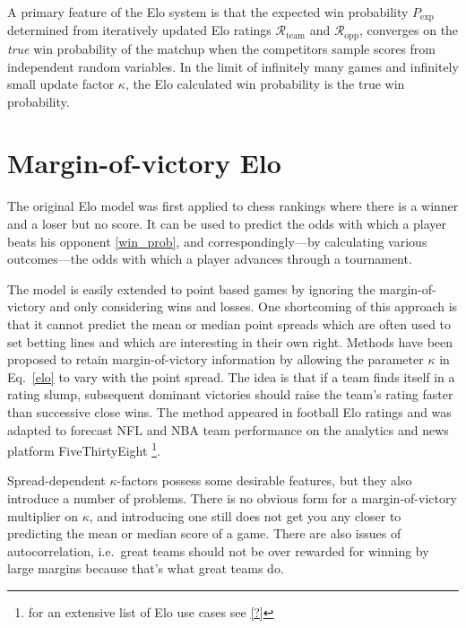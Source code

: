 \documentclass[aps,prc,reprint,amsmath,superscriptaddress]{revtex4-1}
\newcommand{\R}{\mathcal{R}}
\begin{document}
A primary feature of the Elo system is that the expected win probability $P_\text{exp}$ determined from iteratively updated Elo ratings $\R_\text{team}$ and $\R_\text{opp}$, converges on the \emph{true} win probability of the matchup when the competitors sample scores from independent random variables.
In the limit of infinitely many games and infinitely small update factor $\kappa$, the Elo calculated win probability is the true win probability.

\section{Margin-of-victory Elo}

The original Elo model was first applied to chess rankings where there is a winner and a loser but no score.
It can be used to predict the odds with which a player beats his opponent \eqref{win_prob}, and correspondingly---by calculating various outcomes---the odds with which a player advances through a tournament. 

The model is easily extended to point based games by ignoring the margin-of-victory and only considering wins and losses.
One shortcoming of this approach is that it cannot predict the mean or median point spreads which are often used to set betting lines and which are interesting in their own right.
Methods have been proposed to retain margin-of-victory information by allowing the parameter $\kappa$ in Eq.~\eqref{elo} to vary with the point spread.
The idea is that if a team finds itself in a rating slump, subsequent dominant victories should raise the team's rating faster than successive close wins.
The method appeared in football Elo ratings \cite{?} and was adapted to forecast NFL and NBA team performance on the analytics and news platform FiveThirtyEight \footnote{for an extensive list of Elo use cases see \ref{?}}.

Spread-dependent $\kappa$-factors possess some desirable features, but they also introduce a number of problems.
There is no obvious form for a margin-of-victory multiplier on $\kappa$, and introducing one still does not get you any closer to predicting the mean or median score of a game.
There are also issues of autocorrelation, i.e.\ great teams should not be over rewarded for winning by large margins because that's what great teams do.
\end{document}
